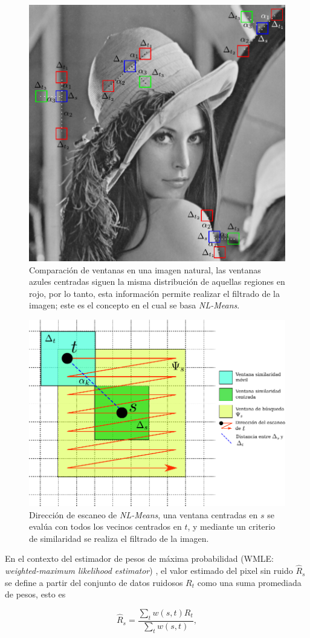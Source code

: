 \begin{figure}[!ht]
	\centering
	\includegraphics[width=0.5\linewidth]{img/chap3/lennaPatches}
	\caption[Comparación de ventanas en imagen natural.]{Comparación de ventanas en una imagen natural, las ventanas azules centradas siguen la misma distribución de aquellas regiones en rojo, por lo tanto, esta información permite realizar el filtrado de la imagen; este es el concepto en el cual se basa \textit{NL-Means}.}
	\label{fig:lennaPatches}
\end{figure}

\begin{figure}[!ht]
	\centering
	\includegraphics[width=0.5\linewidth]{img/chap3/patches}
	\caption[Dirección de escaneo de \textit{NL-Means}.]{Dirección de escaneo de \textit{NL-Means}, una ventana centradas en $s$ se evalúa con todos los vecinos centrados en $t$, y mediante un criterio de similaridad se realiza el filtrado de la imagen.}
	\label{fig:patches}
\end{figure}

En el contexto del estimador de pesos de máxima probabilidad (WMLE: \textit{weighted-maximum likelihood estimator}) \cite{Baudes2005}, el valor estimado del pixel sin ruido $\hat{R}_s$ se define a partir del conjunto de datos ruidosos $R_t$ como una suma promediada de pesos, esto es

\begin{equation}
\label{eq:R_WMLE}
\hat{R}_s = \frac{\sum_t w(s,t) R_t}{\sum_t w(s,t)},
\end{equation}

